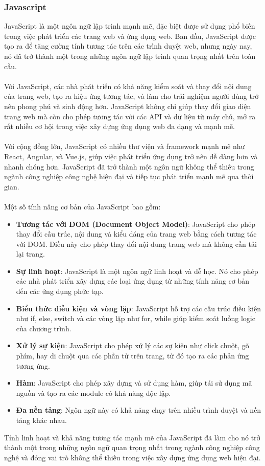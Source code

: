 \subsubsection*{Javascript}
JavaScript là một ngôn ngữ lập trình mạnh mẽ, đặc biệt được sử dụng phổ biến trong việc phát triển các trang web và ứng dụng web. Ban đầu, JavaScript được tạo ra để tăng cường tính tương tác trên các trình duyệt web, nhưng ngày nay, nó đã trở thành một trong những ngôn ngữ lập trình quan trọng nhất trên toàn cầu.\\
\\
Với JavaScript, các nhà phát triển có khả năng kiểm soát và thay đổi nội dung của trang web, tạo ra hiệu ứng tương tác, và làm cho trải nghiệm người dùng trở nên phong phú và sinh động hơn. JavaScript không chỉ giúp thay đổi giao diện trang web mà còn cho phép tương tác với các API và dữ liệu từ máy chủ, mở ra rất nhiều cơ hội trong việc xây dựng ứng dụng web đa dạng và mạnh mẽ.\\
\\
Với cộng đồng lớn, JavaScript có nhiều thư viện và framework mạnh mẽ như React, Angular, và Vue.js, giúp việc phát triển ứng dụng trở nên dễ dàng hơn và nhanh chóng hơn. JavaScript đã trở thành một ngôn ngữ không thể thiếu trong ngành công nghiệp công nghệ hiện đại và tiếp tục phát triển mạnh mẽ qua thời gian. \\
\\
Một số tính năng cơ bản của JavaScript bao gồm:
\begin{itemize}
    \item \textbf{Tương tác với DOM (Document Object Model)}: JavaScript cho phép thay đổi cấu trúc, nội dung và kiểu dáng của trang web bằng cách tương tác với DOM. Điều này cho phép thay đổi nội dung trang web mà không cần tải lại trang.

    \item \textbf{Sự linh hoạt}: JavaScript là một ngôn ngữ linh hoạt và dễ học. Nó cho phép các nhà phát triển xây dựng các loại ứng dụng từ những tính năng cơ bản đến các ứng dụng phức tạp.

    \item \textbf{Biểu thức điều kiện và vòng lặp}: JavaScript hỗ trợ các cấu trúc điều kiện như if, else, switch và các vòng lặp như for, while giúp kiểm soát luồng logic của chương trình.

    \item \textbf{Xử lý sự kiện}: JavaScript cho phép xử lý các sự kiện như click chuột, gõ phím, hay di chuột qua các phần tử trên trang, từ đó tạo ra các phản ứng tương ứng.

    \item \textbf{Hàm}: JavaScript cho phép xây dựng và sử dụng hàm, giúp tái sử dụng mã nguồn và tạo ra các module có khả năng độc lập.

    \item \textbf{Đa nền tảng}: Ngôn ngữ này có khả năng chạy trên nhiều trình duyệt và nền tảng khác nhau.
\end{itemize}
Tính linh hoạt và khả năng tương tác mạnh mẽ của JavaScript đã làm cho nó trở thành một trong những ngôn ngữ quan trọng nhất trong ngành công nghiệp công nghệ và đóng vai trò không thể thiếu trong việc xây dựng ứng dụng web hiện đại.
